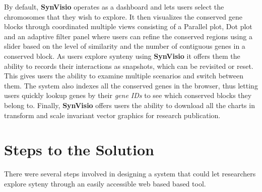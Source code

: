 By default, \textbf{SynVisio} operates as a dashboard and lets users select the chromosomes that they wish to explore. It then visualizes the conserved gene blocks through coordinated multiple views consisting of a Parallel plot, Dot plot and an adaptive filter panel where users can refine the conserved regions using a slider based on the level of similarity and the number of contiguous genes in a conserved block.
As users explore synteny using \textbf{SynVisio} it offers them the ability to records their interactions as snapshots, which can be revisited or reset. This gives users the ability to examine multiple scenarios and switch between them. The system also indexes all the conserved genes in the browser, thus letting users quickly lookup genes by their \textit{gene IDs} to see which conserved blocks they belong to. Finally, \textbf{SynVisio} offers users the ability to download all the charts in transform and scale invariant vector graphics for research publication.

\section{Steps to the Solution} 
There were several steps involved in designing a system that could let researchers explore syteny through an easily accessible web based based tool.

